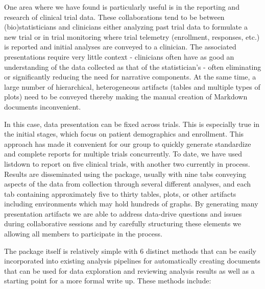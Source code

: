 \documentclass[
]{jss}
\begin{document}
One area where we have found  is particularly useful is in
the reporting and research of clinical trial data. These collaborations
tend to be between (bio)statisticians and clinicians either analyzing
past trial data to formulate a new trial or in trial monitoring where
trial telemetry (enrollment, responses, etc.) is reported and initial
analyses are conveyed to a clinician. The associated presentations
require very little context - clinicians often have as good an
understanding of the data collected as that of the statistician's -
often eliminating or significantly reducing the need for narrative
components. At the same time, a large number of hierarchical,
heterogeneous artifacts (tables and multiple types of plots) need to be
conveyed thereby making the manual creation of  Markdown
documents inconvenient.

In this case, data presentation can be fixed across trials. This is
especially true in the initial stages, which focus on patient
demographics and enrollment. This approach has made it convenient for
our group to quickly generate standardize and complete reports for
multiple trials concurrently. To date, we have used listdown to report
on five clinical trials, with another two currently in process. Results
are disseminated using the  package, usually with nine
tabs conveying aspects of the data from collection through several
different analyses, and each tab containing approximately five to thirty
tables, plots, or other artifacts including 
\citep{trelliscopejs} environments which may hold hundreds of graphs. By
generating many presentation artifacts we are able to address data-drive
questions and issues during collaborative sessions and by carefully
structuring these elements we allowing all members to participate in the
process.

The  package itself is relatively simple with 6 distinct
methods that can be easily incorporated into existing analysis pipelines
for automatically creating documents that can be used for data
exploration and reviewing analysis results as well as a starting point
for a more formal write up. These methods include:
\end{document}
